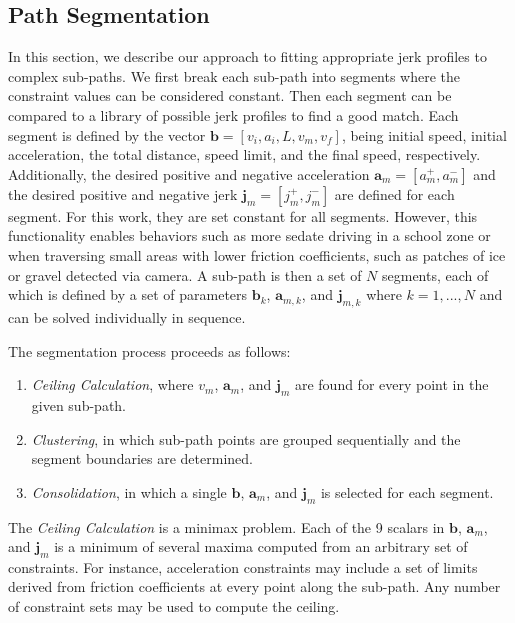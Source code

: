 \documentclass[letterpaper, 10 pt, conference]{ieeeconf}  %
\begin{document}

\subsection{Path Segmentation} \label{sec:pathsegmentation}

In this section, we describe our approach to fitting appropriate jerk profiles to complex sub-paths. 
We first break each sub-path into segments where the constraint values can be considered constant.
Then each segment can be compared to a library of possible jerk profiles to find a good match.
Each segment is defined by the vector $\mathbf{b}  = [v_i, a_i, L, v_m, v_f]$, being initial speed, initial acceleration, the total distance, speed limit, and the final speed, respectively.
Additionally, the desired positive and negative acceleration $\mathbf{a}_m = [a^+_m , a^-_m]$ and the desired positive and negative jerk $\mathbf{j}_m = [j^+_m , j^-_m]$ are defined for each segment.
For this work, they are set constant for all segments.
However, this functionality enables behaviors such as more sedate driving in a school zone or when traversing small areas with lower friction coefficients, such as patches of ice or gravel detected via camera.
A sub-path is then a set of $N$ segments, each of which is defined by a set of parameters $\mathbf{b}_{k}$, $\mathbf{a}_{m,k}$, and $\mathbf{j}_{m,k}$ where $k = 1, ..., N$ and can be solved individually in sequence.


The segmentation process proceeds as follows:
\begin{enumerate} \label{asdf}
  \item \emph{Ceiling Calculation}, where $v_m$, $\mathbf{a}_m$, and $\mathbf{j}_m$ 
are found for every point in the given sub-path.
  \item \emph{Clustering}, in which sub-path points are grouped sequentially and the segment boundaries are determined.
  \item \emph{Consolidation}, in which a single $\mathbf{b}$, $\mathbf{a}_m$, and $\mathbf{j}_m$ is selected for each segment.
\end{enumerate}

The {\it Ceiling Calculation} is a minimax problem.
Each of the 9 scalars in $\mathbf{b}$, $\mathbf{a}_m$, and $\mathbf{j}_m$ is a minimum of several maxima computed from an arbitrary set of constraints.
For instance, acceleration constraints may include a set of limits derived from friction coefficients at every point along the sub-path.
Any number of constraint sets may be used to compute the ceiling.
\end{document}
